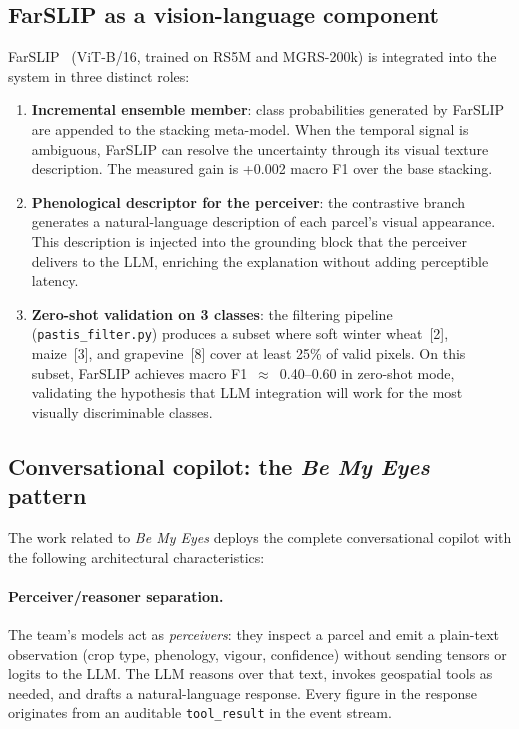 \documentclass{article}
\begin{document}
\subsection{FarSLIP as a vision-language component}

FarSLIP~\cite{li2025farslip} (ViT-B/16, trained on RS5M and MGRS-200k)
is integrated into the system in three distinct roles:

\begin{enumerate}[leftmargin=*]
    \item \textbf{Incremental ensemble member}: class probabilities
    generated by FarSLIP are appended to the stacking meta-model. When
    the temporal signal is ambiguous, FarSLIP can resolve the uncertainty
    through its visual texture description. The measured gain is +0.002
    macro F1 over the base stacking.

    \item \textbf{Phenological descriptor for the perceiver}: the
    contrastive branch generates a natural-language description of each
    parcel's visual appearance. This description is injected into the
    grounding block that the perceiver delivers to the LLM, enriching the
    explanation without adding perceptible latency.

    \item \textbf{Zero-shot validation on 3 classes}: the filtering
    pipeline (\texttt{pastis\_filter.py}) produces a subset where soft
    winter wheat~[2], maize~[3], and grapevine~[8] cover at least 25\%
    of valid pixels. On this subset, FarSLIP achieves macro
    F1~$\approx$~0.40--0.60 in zero-shot mode, validating the hypothesis
    that LLM integration will work for the most visually discriminable
    classes.
\end{enumerate}

\subsection{Conversational copilot: the \textit{Be My Eyes} pattern}

The work related to \textit{Be My Eyes} deploys the complete conversational copilot with the following
architectural characteristics:

\paragraph{Perceiver/reasoner separation.}
The team's models act as \textit{perceivers}: they inspect a parcel and
emit a plain-text observation (crop type, phenology, vigour, confidence)
without sending tensors or logits to the LLM. The LLM reasons over that
text, invokes geospatial tools as needed, and drafts a natural-language
response. Every figure in the response originates from an auditable
\texttt{tool\_result} in the event stream.
\end{document}
